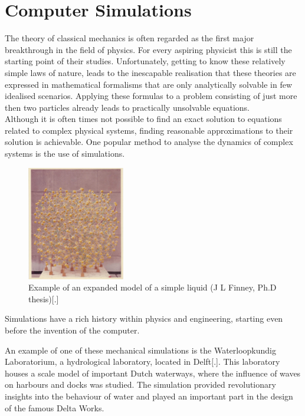 \section{Computer Simulations}

The theory of classical mechanics is often regarded as the first major breakthrough in
the field of physics. For every aspiring physicist this is still the starting point of
their studies. Unfortunately, getting to know these relatively simple laws of nature,
leads to the inescapable realisation that these theories are expressed in mathematical
formalisms that are only analytically solvable in few idealised scenarios. Applying these
formulas to a problem consisting of just more then two particles already leads to
practically unsolvable equations.\\

Although it is often times not possible to find an exact solution to equations
related to complex physical systems, finding reasonable approximations to their solution
is achievable. One popular method to analyse the dynamics of complex systems is the use
of simulations.\\

\begin{figure}
  \begin{center}
    \includegraphics[width=0.38\textwidth]{Figures/WaterModel.png}
  \end{center}
  \caption{Example of an expanded model of a simple liquid (J L Finney, Ph.D thesis)[.]}
\end{figure}

Simulations have a rich history within physics and engineering, starting even before the
invention of the computer.

An example of one of these mechanical simulations is the Waterloopkundig Laboratorium,
a hydrological laboratory, located in Delft[.]. This laboratory houses a scale model of
important Dutch waterways, where the influence of waves on harbours and docks was
studied.  The simulation provided revolutionary insights into the behaviour of water and
played an important part in the design of the famous Delta Works.\\

